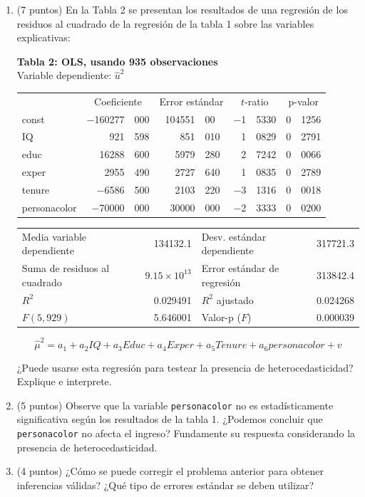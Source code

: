 \documentclass[10pt,a4paper]{article}
\begin{document}
\begin{enumerate}
\begin{enumerate}
 

    \item (7 puntos)  En la Tabla 2 se presentan los resultados de una regresión de los residuos al cuadrado de la regresión de la tabla 1 sobre las variables explicativas:

\begin{center}
\textbf{Tabla 2: OLS, usando 935 observaciones} \\
Variable dependiente: $\hat{u}^2$ \\
\vspace{1em}
\begin{tabular}{lr@{.}lr@{.}lr@{.}lr@{.}l}
 & \multicolumn{2}{c}{Coeficiente} & \multicolumn{2}{c}{Error estándar} & \multicolumn{2}{c}{$t$-ratio} & \multicolumn{2}{c}{p-valor} \\[1ex]
const          & $-$160277&000 & 104551&00 & $-$1&5330 & 0&1256 \\
IQ             & 921&598   & 851&010  & 1&0829  & 0&2791 \\
educ           & 16288&600 & 5979&280 & 2&7242  & 0&0066 \\
exper          & 2955&490  & 2727&640 & 1&0835  & 0&2789 \\
tenure         & $-$6586&500 & 2103&220 & $-$3&1316 & 0&0018 \\
personacolor   & $-$70000&000 & 30000&000 & $-$2&3333 & 0&0200 \\
\end{tabular}

\vspace{1ex}
\begin{tabular}{lrlr}
Media variable dependiente & 134132.1 & Desv. estándar dependiente & 317721.3 \\
Suma de residuos al cuadrado & $9.15 \times 10^{13}$ & Error estándar de regresión & 313842.4 \\
$R^2$ & 0.029491 & $R^2$ ajustado & 0.024268 \\
$F(5, 929)$ & 5.646001 & Valor-p ($F$) & 0.000039 \\
\end{tabular}
\end{center}


    \[
    \hat{\mu}^2 = a_1 + a_2 IQ + a_3 Educ + a_4 Exper + a_5 Tenure + a_6 personacolor + v
    \]

    ¿Puede usarse esta regresión para testear la presencia de heterocedasticidad? Explique e interprete.

      \item (5 puntos) Observe que la variable \texttt{personacolor} no es estadísticamente significativa según los resultados de la tabla 1. ¿Podemos concluir que \texttt{personacolor} no afecta el ingreso? Fundamente su respuesta considerando la presencia de heterocedasticidad. 

        \item (4 puntos) ¿Cómo se puede corregir el problema anterior para obtener inferencias válidas? ¿Qué tipo de errores estándar se deben utilizar? 

   
\end{enumerate}

\end{enumerate}
\end{document}
